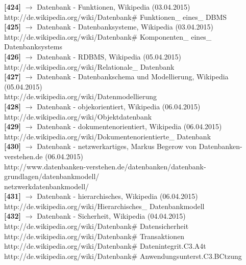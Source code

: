 \documentclass[12pt,a4paper]{report}
\begin{document}
\begin{onehalfspace}
\noindent
\textbf{[424]} $\rightarrow$ Datenbank - Funktionen, Wikipedia (03.04.2015)\\
http://de.wikipedia.org/wiki/Datenbank\# Funktionen\_ eines\_ DBMS\\

\noindent
\textbf{[425]} $\rightarrow$ Datenbank - Datenbanksysteme, Wikipedia (03.04.2015)\\
http://de.wikipedia.org/wiki/Datenbank\# Komponenten\_ eines\_ Datenbanksystems\\

\noindent
\textbf{[426]} $\rightarrow$ Datenbank - RDBMS, Wikipedia (05.04.2015)\\
http://de.wikipedia.org/wiki/Relationale\_ Datenbank\\

\noindent
\textbf{[427]} $\rightarrow$ Datenbank - Datenbankschema und Modellierung, Wikipedia (05.04.2015)\\
http://de.wikipedia.org/wiki/Datenmodellierung\\

\noindent
\textbf{[428]} $\rightarrow$ Datenbank - objekorientiert, Wikipedia (06.04.2015)\\
http://de.wikipedia.org/wiki/Objektdatenbank\\

\noindent
\textbf{[429]} $\rightarrow$ Datenbank - dokumentenorientiert, Wikipedia (06.04.2015)\\
http://de.wikipedia.org/wiki/Dokumentenorientierte\_ Datenbank\\

\noindent
\textbf{[430]} $\rightarrow$ Datenbank - netzwerkartiges, Markus Begerow von Datenbanken-verstehen.de (06.04.2015)\\
http://www.datenbanken-verstehen.de/datenbanken/datenbank-grundlagen/datenbankmodell/\\netzwerkdatenbankmodell/\\

\noindent
\textbf{[431]} $\rightarrow$ Datenbank - hierarchisches, Wikipedia (06.04.2015)\\
http://de.wikipedia.org/wiki/Hierarchisches\_ Datenbankmodell\\

\noindent
\textbf{[432]} $\rightarrow$ Datenbank - Sicherheit, Wikipedia (04.04.2015)\\
http://de.wikipedia.org/wiki/Datenbank\# Datensicherheit\\
http://de.wikipedia.org/wiki/Datenbank\# Transaktionen\\
http://de.wikipedia.org/wiki/Datenbank\# Datenintegrit.C3.A4t\\
http://de.wikipedia.org/wiki/Datenbank\# Anwendungsunterst.C3.BCtzung\\


\end{onehalfspace}
\end{document}
